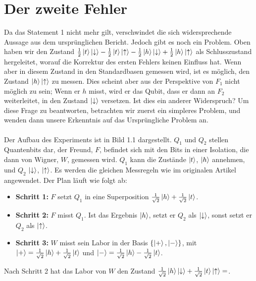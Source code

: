 \documentclass[a4paper]{article}
\begin{document}
\section*{Der zweite Fehler}
Da das Statement 1 nicht mehr gilt, verschwindet die sich widersprechende Aussage aus dem ursprünglichen Bericht. Jedoch gibt es noch ein Problem. Oben haben wir den Zustand $\frac{1}{2}\ket{t}\ket{\downarrow} - \frac{1}{2}\ket{t}\ket{\uparrow} - \frac{1}{2}\ket{h}\ket{\downarrow} + \frac{1}{2}\ket{h}\ket{\uparrow}$ als Schlusszustand hergeleitet, worauf die Korrektur des ersten Fehlers keinen Einfluss hat. Wenn aber in diesem Zustand in den Standardbasen gemessen wird, ist es möglich, den Zustand $\ket{h}\ket{\uparrow}$ zu messen. Dies scheint aber aus der Perspektive von $F_1$ nicht möglich zu sein; Wenn er $h$ misst, wird er das Qubit, dass er dann an $F_2$ weiterleitet, in den Zustand $\ket{\downarrow}$ versetzen. Ist dies ein anderer Widerspruch? Um diese Frage zu beantworten, betrachten wir zuerst ein simpleres Problem, und wenden dann unsere Erkenntnis auf das Ursprüngliche Problem an.\\\\
Der Aufbau des Experiments ist in Bild 1.1 dargestellt. $Q_1$ und $Q_2$ stellen Quantenbits dar, der Freund, $F$, befindet sich mit den Bits in einer Isolation, die dann von Wigner, $W$, gemessen wird. $Q_1$ kann die Zustände $\ket{t}$, $\ket{h}$ annehmen, und $Q_2$ $\ket{\downarrow}$, $\ket{\uparrow}$. Es werden die gleichen Messregeln wie im originalen Artikel angewendet. Der Plan läuft wie folgt ab:
\begin{itemize}
	\item \textbf{Schritt 1:} $F$ setzt $Q_1$ in eine Superposition $\frac{1}{\sqrt{2}} \ket{h} + \frac{1}{\sqrt{2}} \ket{t}$.
	\item \textbf{Schritt 2:} $F$ misst $Q_1$. Ist das Ergebnis $\ket{h}$, setzt er $Q_2$ als $\ket{\downarrow}$, sonst setzt er $Q_2$ als $\ket{\uparrow}$.
	\item \textbf{Schritt 3:} $W$ misst sein Labor in der Basis $\qty{\ket{+}, \ket{-}}$, mit $\ket{+} = \frac{1}{\sqrt{2}} \ket{h} + \frac{1}{\sqrt{2}} \ket{t}$ und $\ket{-} = \frac{1}{\sqrt{2}} \ket{h} - \frac{1}{\sqrt{2}} \ket{t}$.
\end{itemize}
Nach Schritt 2 hat das Labor von $W$ den Zustand $\frac{1}{\sqrt{2}} \ket{h}\ket{\downarrow} + \frac{1}{\sqrt{2}} \ket{t}\ket{\uparrow} = $.
\end{document}
